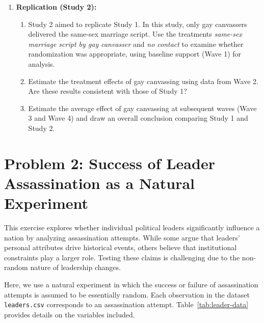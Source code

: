 \documentclass[12pt]{article}
\begin{document}
\begin{enumerate}
    \item \textbf{Replication (Study 2):} 
    \begin{enumerate}
        \item Study 2 aimed to replicate Study 1. In this study, only gay canvassers delivered the same-sex marriage script. Use the treatments \textit{same-sex marriage script by gay canvasser} and \textit{no contact} to examine whether randomization was appropriate, using baseline support (Wave 1) for analysis.
        \item Estimate the treatment effects of gay canvassing using data from Wave 2. Are these results consistent with those of Study 1?
        \item Estimate the average effect of gay canvassing at subsequent waves (Wave 3 and Wave 4) and draw an overall conclusion comparing Study 1 and Study 2.
    \end{enumerate}
\end{enumerate}

% 
% 

\newpage

\section*{\large Problem 2: Success of Leader Assassination as a Natural Experiment}

This exercise explores whether individual political leaders significantly influence a nation by analyzing assassination attempts. While some argue that leaders' personal attributes drive historical events, others believe that institutional constraints play a larger role. Testing these claims is challenging due to the non-random nature of leadership changes.

Here, we use a natural experiment in which the success or failure of assassination attempts is assumed to be essentially random. Each observation in the dataset \texttt{leaders.csv} corresponds to an assassination attempt. Table~\ref{tab:leader-data} provides details on the variables included.
\end{document}
